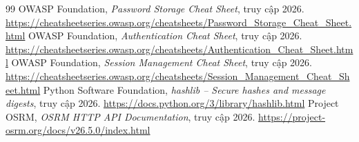 \documentclass[12pt,a4paper,oneside]{report}
\begin{document}
\begin{thebibliography}{99}
 OWASP Foundation, \emph{Password Storage Cheat Sheet}, truy cập 2026. \url{https://cheatsheetseries.owasp.org/cheatsheets/Password_Storage_Cheat_Sheet.html}
 OWASP Foundation, \emph{Authentication Cheat Sheet}, truy cập 2026. \url{https://cheatsheetseries.owasp.org/cheatsheets/Authentication_Cheat_Sheet.html}
 OWASP Foundation, \emph{Session Management Cheat Sheet}, truy cập 2026. \url{https://cheatsheetseries.owasp.org/cheatsheets/Session_Management_Cheat_Sheet.html}
 Python Software Foundation, \emph{hashlib -- Secure hashes and message digests}, truy cập 2026. \url{https://docs.python.org/3/library/hashlib.html}
 Project OSRM, \emph{OSRM HTTP API Documentation}, truy cập 2026. \url{https://project-osrm.org/docs/v26.5.0/index.html}
\end{thebibliography}
\end{document}

